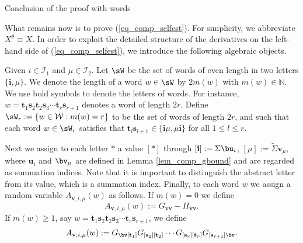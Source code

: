 \begin{subsection}{Conclusion of the proof with words}\label{section_words}

What remains now is to prove (\ref{eq_comp_selfest}). For simplicity, we abbreviate $X^\theta \equiv X$. %
In order to exploit the detailed structure of the derivatives on the left-hand side of (\ref{eq_comp_selfest}), we introduce the following algebraic objects.

\begin{definition}[Words]\label{def_comp_words}
Given $i\in \mathcal I_1$ and $\mu\in \mathcal I_2$. Let $\sW$ be the set of words of even length in two letters $\{\mathbf i, {\mu}\}$. We denote the length of a word $w\in\sW$ by $2m(w)$ with $m(w)\in \mathbb N$. We use bold symbols to denote the letters of words. For instance, $w=\mathbf t_1\mathbf s_2\mathbf t_2\mathbf s_3\cdots\mathbf t_r\mathbf s_{r+1}$ denotes a word of length $2r$.
Define $\sW_r:=\{w\in \mathcal W: m(w)=r\}$ to be the set of words of length $2r$, and such that
each word $w\in \sW_r$ satisfies that $\mathbf t_l\mathbf s_{l+1}\in\{\mathbf i{}{\mu},{}{\mu}\mathbf i\}$ for all $1\le l\le r$.

Next we assign to each letter $*$ a value $[*]$ through $[\mathbf i]:=\Sigma \bu_i$, $[{} {\mu}]:=\tilde \Sigma \mathbf v_\mu,$ where $\mathbf u_i$ and $\bv_\mu$ are defined in Lemma \ref{lem_comp_gbound} and are regarded as summation indices. Note that it is important to distinguish the abstract letter from its value, which is a summation index. Finally, to each word $w$ we assign a random variable $A_{\mathbf v, i, \mu}(w)$ as follows. If $m(w)=0$ we define
 $$A_{\mathbf v, i, \mu}(w):=G_{\mathbf v\mathbf v}-\Pi_{\mathbf v\mathbf v}.$$
 If $m(w)\ge 1$, say $w=\mathbf t_1\mathbf s_2\mathbf t_2\mathbf s_3\cdots\mathbf t_r\mathbf s_{r+1}$, we define
 \begin{equation}\label{eq_comp_A(W)}
 A_{\mathbf v, i, \mu}(w):=G_{\bv[\mathbf t_1]} G_{[\mathbf s_2][\mathbf t_2]}\cdots G_{[\mathbf s_r][\mathbf t_r]} G_{[\mathbf s_{r+1}]\bv}.
 \end{equation}
\end{definition}


\end{subsection}
